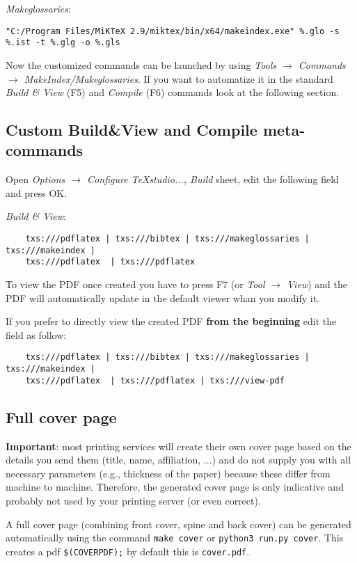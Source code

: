 \textit{Makeglossaries}:
{\scriptsize
\begin{verbatim}
"C:/Program Files/MiKTeX 2.9/miktex/bin/x64/makeindex.exe" %.glo -s %.ist -t %.glg -o %.gls
\end{verbatim}}

Now the customized commands can be launched by using \textit{Tools $\to$ Commands $\to$ MakeIndex/Makeglossaries}. If you want to automatize it in the standard \textit{Build \& View} (F5) and \textit{Compile} (F6) commands look at the following section.

\subsection{Custom Build\&View and Compile meta-commands}

Open \textit{Options $\to$ Configure TeXstudio...,  Build} sheet, edit the following field and press OK.

\textit{Build \& View}:
{\footnotesize\begin{verbatim}
	txs:///pdflatex | txs:///bibtex | txs:///makeglossaries | txs:///makeindex |
	txs:///pdflatex  | txs:///pdflatex
	\end{verbatim}}

To view the PDF once created you have to press F7 (or \textit{Tool $\to$ View}) and the PDF will automatically update in the default viewer whan you modify it. 

If you prefer to directly view the created PDF\textbf{ from the beginning }edit the field as follow:
{\footnotesize\begin{verbatim}
	txs:///pdflatex | txs:///bibtex | txs:///makeglossaries | txs:///makeindex |
	txs:///pdflatex  | txs:///pdflatex | txs:///view-pdf
	\end{verbatim}}


\subsection{Full cover page}

\textbf{Important}: most printing services will create their own cover page based
on the details you send them (title, name, affiliation, ...) and do not supply
you with all necessary parameters (e.g., thickness of the paper) because these
differ from machine to machine. Therefore, the generated cover page is only
indicative and probably not used by your printing server (or even correct).


A full cover page (combining front cover, spine and back cover) can be
generated automatically using the command \texttt{make cover} or \texttt{python3 run.py cover}. This creates a pdf
\texttt{\$(COVERPDF);} by default this is \texttt{cover.pdf}.


